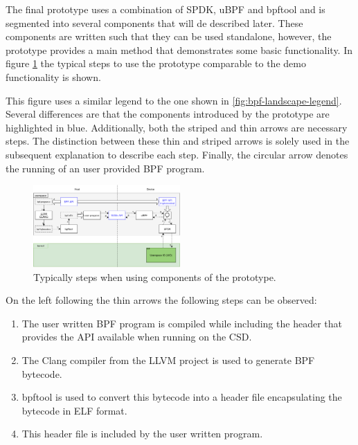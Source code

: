 \documentclass[conference]{IEEEtran}
\begin{document}
The final prototype uses a combination of SPDK, uBPF and bpftool and is
segmented into several components that will de described later. These components
are written such that they can be used standalone, however, the prototype
provides a main method that demonstrates some basic functionality. In figure
\ref{fig:prototypesteps} the typical steps to use the prototype comparable to
the demo functionality is shown.

This figure uses a similar legend to the one shown in
\ref{fig:bpf-landscape-legend}. Several differences are that the components
introduced by the prototype are highlighted in blue. Additionally, both the
striped and thin arrows are necessary steps. The distinction between these
thin and striped arrows is solely used in the subsequent explanation to describe
each step. Finally, the circular arrow denotes the running of an user provided
BPF program.

\begin{center}
	\begin{figure}[H]
		\includegraphics[width=0.5\textwidth]{resources/images/prototype-landscape}
		\captionsetup{justification=centering}
		\caption{Typically steps when using components of the prototype.}
		\label{fig:prototypesteps}
	\end{figure}
\end{center}

On the left following the thin arrows the following steps can be observed:
\begin{enumerate} \item The user written
BPF program is compiled while including the header that provides the API
available when running on the CSD. \item The Clang compiler from the LLVM
project is used to generate BPF bytecode. \item bpftool is used to convert this
bytecode into a header file encapsulating the bytecode in ELF format. \item This
header file is included by the user written program.
\end{enumerate}
\end{document}

